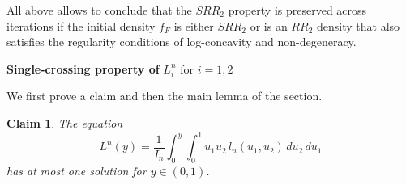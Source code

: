 \documentclass[onecolumn]{article}
\newtheorem{claim}[theorem]{Claim}
\begin{document}
All above allows to conclude that the $SRR_{2}$ property is preserved across
iterations if the initial density $f_{F}$ is either $SRR_{2}$ or is an $%
RR_{2}$ density that also satisfies the regularity conditions of
log-concavity and non-degeneracy.\hfill

\begin{flushleft}
\textbf{Single-crossing property of }$L_{i}^{n}$ for $i=1,2$
\end{flushleft}

We first prove a claim and then the main lemma of the section.

\begin{claim}
\label{single-sol} The equation 
\begin{equation}
L_{1}^{n}(y)=\frac{1}{I_{n}}\int_{0}^{y}\int_{0}^{1}u_{1}u_{2}%
\,l_{n}(u_{1},u_{2})\,du_{2}\,du_{1}  \label{339}
\end{equation}%
has at most one solution for $y\in (0,1)$.
\end{claim}
\end{document}
